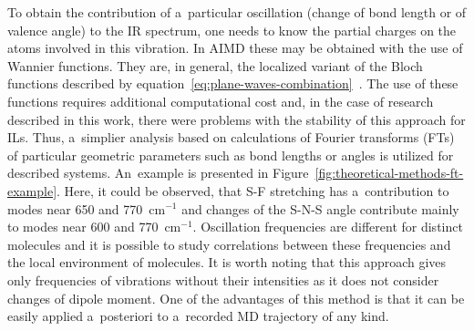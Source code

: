 To obtain the contribution of a~particular oscillation (change of bond length or of valence angle) to the IR spectrum, one needs to know the partial charges on the atoms involved in this vibration. In AIMD these may be obtained with the use of Wannier functions. They are, in general, the localized variant of the Bloch functions described by equation~\ref{eq:plane-waves-combination}~\cite{wannier}. The use of these functions requires additional computational cost and, in the case of research described in this work, there were problems with the stability of this approach for ILs. Thus, a~simplier analysis based on calculations of Fourier transforms (FTs) of particular geometric parameters such as bond lengths or angles is utilized for described systems. An~example is presented in Figure~\ref{fig:theoretical-methods-ft-example}. Here, it could be observed, that S-F stretching has a~contribution to modes near 650 and 770~cm$^{-1}$ and changes of the S-N-S angle contribute mainly to modes near 600 and 770~cm$^{-1}$. Oscillation frequencies are different for distinct molecules and it is possible to study correlations between these frequencies and the local environment of molecules. It is worth noting that this approach gives only frequencies of vibrations without their intensities as it does not consider changes of dipole moment. One of the advantages of this method is that it can be easily applied a~posteriori to a~recorded MD trajectory of any kind.